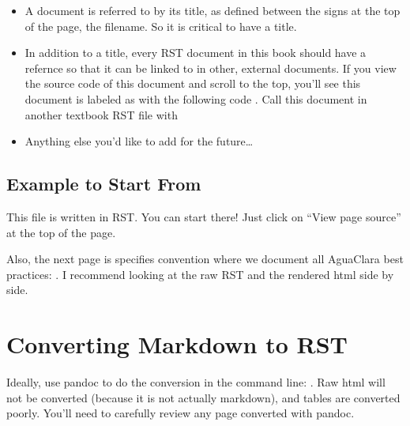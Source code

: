\documentclass[letterpaper,10pt,english]{sphinxmanual}
\begin{document}
\begin{itemize}
\item {} 
A document is referred to by its title, as defined between the \sphinxcode{\sphinxupquote{*****}} signs at the top of the page,  the filename. So it is critical to have a title.

\item {} 
In addition to a title, every RST document in this book should have a refernce so that it can be linked to in other, external documents. If you view the source code of this document and scroll to the top, you’ll see this document is labeled as  with the following code . Call this document in another textbook RST file with 

\item {} 
Anything else you’d like to add for the future…

\end{itemize}


\subsection{Example to Start From}
\label{\detokenize{Textbook_Creation_Help/rst_intro:example-to-start-from}}\label{\detokenize{Textbook_Creation_Help/rst_intro:id7}}
This file is written in RST. You can start there! Just click on “View page source” at the top of the page.

Also, the next page is specifies convention where we document all AguaClara best practices: . I recommend looking at the raw RST and the rendered html side by side.


\section{Converting Markdown to RST}
\label{\detokenize{Textbook_Creation_Help/rst_intro:converting-markdown-to-rst}}\label{\detokenize{Textbook_Creation_Help/rst_intro:converting-md-to-rst}}
Ideally, use pandoc to do the conversion in the command line: .
Raw html will not be converted (because it is not actually markdown), and tables are converted poorly.
You’ll need to carefully review any page converted with pandoc.
\end{document}
